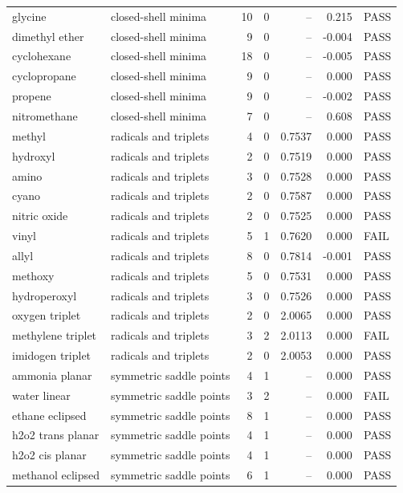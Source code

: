 \begin{tabular}{llrrrrl}
glycine & closed-shell minima & 10 & 0 & -- & 0.215 & PASS \\
dimethyl ether & closed-shell minima & 9 & 0 & -- & -0.004 & PASS \\
cyclohexane & closed-shell minima & 18 & 0 & -- & -0.005 & PASS \\
cyclopropane & closed-shell minima & 9 & 0 & -- & 0.000 & PASS \\
propene & closed-shell minima & 9 & 0 & -- & -0.002 & PASS \\
nitromethane & closed-shell minima & 7 & 0 & -- & 0.608 & PASS \\
methyl & radicals and triplets & 4 & 0 & 0.7537 & 0.000 & PASS \\
hydroxyl & radicals and triplets & 2 & 0 & 0.7519 & 0.000 & PASS \\
amino & radicals and triplets & 3 & 0 & 0.7528 & 0.000 & PASS \\
cyano & radicals and triplets & 2 & 0 & 0.7587 & 0.000 & PASS \\
nitric oxide & radicals and triplets & 2 & 0 & 0.7525 & 0.000 & PASS \\
vinyl & radicals and triplets & 5 & 1 & 0.7620 & 0.000 & FAIL \\
allyl & radicals and triplets & 8 & 0 & 0.7814 & -0.001 & PASS \\
methoxy & radicals and triplets & 5 & 0 & 0.7531 & 0.000 & PASS \\
hydroperoxyl & radicals and triplets & 3 & 0 & 0.7526 & 0.000 & PASS \\
oxygen triplet & radicals and triplets & 2 & 0 & 2.0065 & 0.000 & PASS \\
methylene triplet & radicals and triplets & 3 & 2 & 2.0113 & 0.000 & FAIL \\
imidogen triplet & radicals and triplets & 2 & 0 & 2.0053 & 0.000 & PASS \\
ammonia planar & symmetric saddle points & 4 & 1 & -- & 0.000 & PASS \\
water linear & symmetric saddle points & 3 & 2 & -- & 0.000 & FAIL \\
ethane eclipsed & symmetric saddle points & 8 & 1 & -- & 0.000 & PASS \\
h2o2 trans planar & symmetric saddle points & 4 & 1 & -- & 0.000 & PASS \\
h2o2 cis planar & symmetric saddle points & 4 & 1 & -- & 0.000 & PASS \\
methanol eclipsed & symmetric saddle points & 6 & 1 & -- & 0.000 & PASS \\

\end{tabular}
